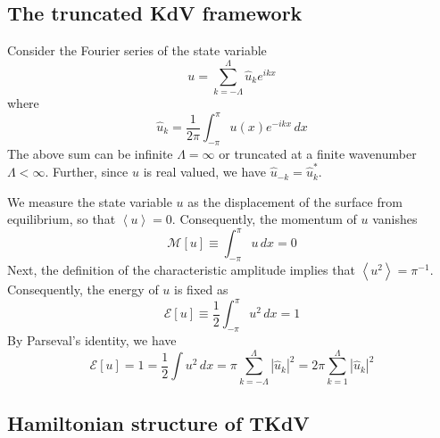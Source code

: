 \documentclass[11pt]{article}
\newcommand{\abs}[1]{\left| #1 \right|}
\newcommand{\mean}[1]{\left< #1 \right>}
\newcommand{\dx}{\, dx}
\newcommand{\En}{\mathcal{E}}
\newcommand{\Mo}{\mathcal{M}}
\newcommand{\uhat}{\hat{u}}
\begin{document}
 



\subsection{The truncated KdV framework}
\label{tKdVSec}

Consider the Fourier series of the state variable
\begin{equation}
u = \sum_{k=-\Lambda}^{\Lambda} \uhat_k e^{i k x}
\end{equation}
where
\begin{equation}
\uhat_k = \frac{1}{2 \pi} \int_{-\pi}^{\pi} u(x) e^{-i k x} \dx
\end{equation}
The above sum can be infinite $\Lambda = \infty$ or truncated at a finite wavenumber $\Lambda < \infty$. Further, since $u$ is real valued, we have $\uhat_{-k} = \uhat_{k}^*$.


We measure the state variable $u$ as the displacement of the surface from equilibrium, so that $\mean{u} = 0$. Consequently, the momentum of $u$ vanishes
\begin{equation}
\Mo[u] \equiv \int_{-\pi}^{\pi} u \dx = 0
\end{equation}
Next, the definition of the characteristic amplitude implies that $\mean{u^2} = \pi^{-1}$. Consequently, the energy of $u$ is fixed as
\begin{equation}
\En[u] \equiv \frac{1}{2} \int_{-\pi}^{\pi} u^2 \dx = 1
\end{equation}
By Parseval's identity, we have
\begin{equation}
\En[u] = 1 = \frac{1}{2} \int u^2 \dx = \pi \sum_{k=-\Lambda}^{\Lambda} \abs{\uhat_k}^2 = 2 \pi \sum_{k=1}^{\Lambda} \abs{\uhat_k}^2
\end{equation}

\subsection{Hamiltonian structure of TKdV}
\end{document}

